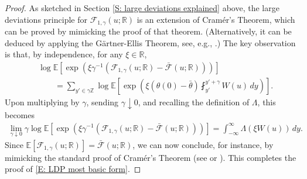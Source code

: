 \documentclass[12pt]{amsart}
\newcommand{\E}{\mathbb{E}}
\begin{document}
		\begin{proof} As sketched in Section \ref{S: large deviations explained} above, the large deviations principle for $\mathscr{F}_{1,\gamma}(u;\mathbb{R})$ is an extension of Cram\'{e}r's Theorem, which can be proved by mimicking the proof of that theorem. (Alternatively, it can be deduced by applying the G\"{a}rtner-Ellis Theorem, see, e.g., \cite[Section 12.2]{Rassoul-Agha}.) The key observation is that, by independence, for any $\xi \in \mathbb{R}$,
        \begin{align*}
            & \log \mathbb{E} [ \exp ( \xi \gamma^{-1} ( \mathscr{F}_{1,\gamma}(u;\mathbb{R})  - \bar{\mathscr{F}}(u;\mathbb{R}))) ] \\
            & \qquad = \sum_{y' \in \gamma \mathbb{Z}} \log \mathbb{E} [ \exp ( \xi ( \theta(0) - \bar{\theta} ) \fint_{y'}^{y' + \gamma} W(u) \, dy ) ].
        \end{align*}
Upon multiplying by $\gamma$, sending $\gamma \downarrow 0$, and recalling the definition of $\Lambda$, this becomes
        \begin{align*}
        \lim_{ \gamma \downarrow 0 } \gamma  \log \mathbb{E} [ \exp ( \xi \gamma^{-1} ( \mathscr{F}_{1,\gamma}(u;\mathbb{R})  - \bar{\mathscr{F}}(u;\mathbb{R})) ) ] = \int_{-\infty}^{\infty} \Lambda ( \xi W(u) ) \, dy.
        \end{align*}
       Since $ \E [ \mathscr{F}_{ 1 , \gamma } ( u ; \mathbb{R} ) ] = \bar{\mathscr{F}}(u;\mathbb{R}) $, we can now conclude, for instance, by mimicking the standard proof of Cram\'{e}r's Theorem (see \cite[Section 5.11]{grimmett_stirzaker} or \cite[Section 2.4]{varadhan}). This completes the proof of \eqref{E: LDP most basic form}.
        

\end{proof}
\end{document}
